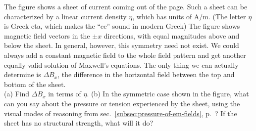 The figure shows a sheet of current coming out of the page. Such a
sheet can be characterized by a linear current density $\eta$, which has
units of A/m. (The letter $\eta$ is Greek eta, which makes the ``ee''
sound in modern Greek) The figure shows magnetic field vectors in the
$\pm x$ directions, with equal magnitudes above and below the sheet.
In general, however, this symmetry need not exist.  We could always
add a constant magnetic field to the whole field pattern and get
another equally valid solution of Maxwell's equations. The only thing
we can actually determine is $\Delta B_x$, the difference in the
horizontal field between the top and bottom of the sheet.\\
(a) Find $\Delta B_x$ in terms of $\eta$.\answercheck\hwendpart
(b) In the symmetric case shown in the figure,
what can you say about the pressure or tension experienced by the sheet, using the visual modes of reasoning
from sec.~\ref{subsec:pressure-of-em-fields}, p.~\pageref{subsec:pressure-of-em-fields}? If the sheet has no
structural strength, what will it do?
